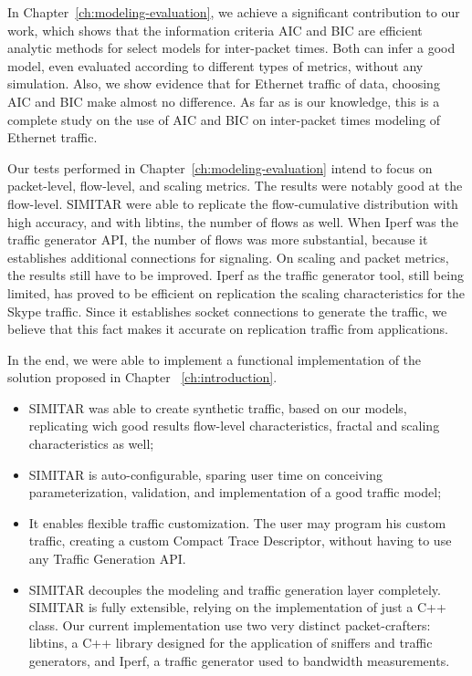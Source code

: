 In Chapter~\ref{ch:modeling-evaluation}, we achieve a significant contribution to our work, which shows that the information criteria AIC and BIC are efficient analytic methods for select models for inter-packet times. Both can infer a good model, even evaluated according to different types of metrics, without any simulation. Also, we show evidence that for Ethernet traffic of data, choosing AIC and BIC make almost no difference. As far as is our knowledge, this is a complete study on the use of AIC and BIC on inter-packet times modeling of Ethernet traffic.

Our tests performed in Chapter~\ref{ch:modeling-evaluation} intend to focus on packet-level, flow-level, and scaling metrics. The results were notably good at the flow-level. SIMITAR were able to replicate the flow-cumulative distribution with high accuracy, and with libtins, the number of flows as well. When Iperf was the traffic generator API, the number of flows was more substantial, because it establishes additional connections for signaling. On scaling and packet metrics, the results still have to be improved. Iperf as the traffic generator tool, still being limited, has proved to be efficient on replication the scaling characteristics for the Skype traffic. Since it establishes socket connections to generate the traffic, we believe that this fact makes it accurate on replication traffic from applications.

In the end, we were able to implement a functional implementation of the solution proposed in Chapter ~\ref{ch:introduction}.  
\begin{itemize}
\item SIMITAR was able to create synthetic traffic, based on our models, replicating wich good results flow-level characteristics, fractal and scaling characteristics as well;
\item SIMITAR is auto-configurable, sparing user time on conceiving parameterization, validation, and implementation of a good traffic model;
\item It enables flexible traffic customization. The user may program his custom traffic, creating a custom Compact Trace Descriptor, without having to use any Traffic Generation API.  
\item SIMITAR decouples the modeling and traffic generation layer completely. SIMITAR is fully extensible, relying on the implementation of just a C++ class.  Our current implementation use two very distinct packet-crafters: libtins, a C++ library designed for the application of sniffers and traffic generators, and Iperf, a traffic generator used to bandwidth measurements. 
\end{itemize}

